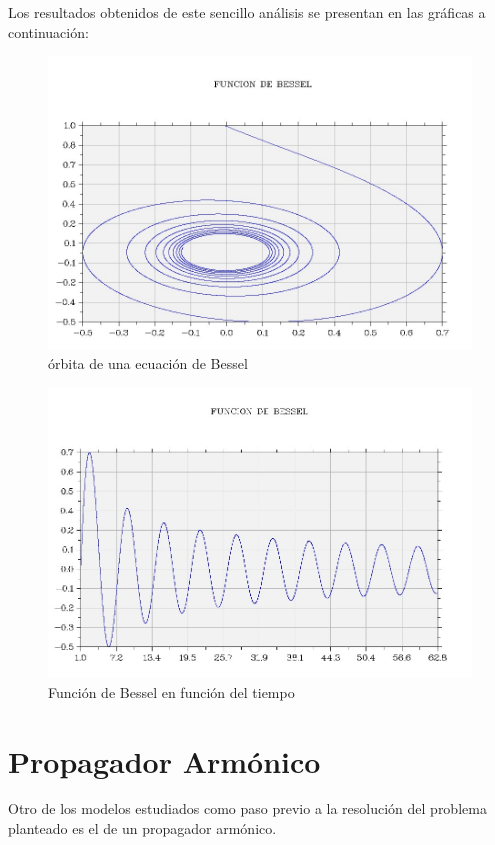 \documentclass[11pt,singlespacing,liststotoc,headsepline,a4paper]{article}
\begin{document}
Los resultados obtenidos de este sencillo análisis se presentan en las gráficas a continuación:

\begin{figure}[H]
	\centering
	\includegraphics[width=1\textwidth]{Bessel.jpg}
	\caption{órbita de una ecuación de Bessel}
	\label{Bessel}
\end{figure}

\begin{figure}[H]
	\centering
	\includegraphics[width=1\textwidth]{Bessel_O.jpg}
	\caption{Función de Bessel en función del tiempo}
	\label{Bessel_O}
\end{figure}

	\newpage

\section{Propagador Armónico}
Otro de los modelos estudiados como paso previo a la resolución del problema planteado es el de un propagador armónico.
\end{document}

